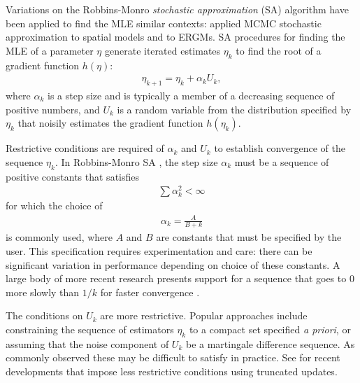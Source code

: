 Variations on the Robbins-Monro \emph{stochastic approximation} (SA) algorithm 
\citep{Robbins-Monro} have been applied to find the MLE similar contexts: 
\citet{Younes:1988,Younes:1989,Moyeed:1991,Gu:2001}
applied MCMC stochastic approximation to spatial models and \citet{Snijders:2002} to 
ERGMs.
SA procedures for finding the MLE of a parameter $\eta$ generate iterated estimates 
$\eta_k$ to find the 
root of a gradient function $h(\eta)$:
\begin{align} \label{E:eta SA update}
	\eta_{k+1} = \eta_k + \alpha_k U_k,
\end{align}
where $\alpha_k$ is a step size and is typically a member of a decreasing sequence of 
positive numbers, and $U_k$ is a 
random variable from the distribution specified by $\eta_k$ that noisily estimates the 
gradient function $h(\eta_k)$.  

Restrictive conditions are required of $\alpha_k$ and $U_k$ to establish convergence 
of the sequence $\eta_k$.  
In Robbins-Monro SA \citep{Robbins-Monro}, the step size $\alpha_k$ must be a sequence 
of positive constants 
that satisfies 
\begin{align*}
	\sum \alpha_k^2 < \infty
\end{align*}
for which the choice of
\begin{align} \label{E:SA step size}
	\alpha_k = \frac{A}{B + k}
\end{align}
 is commonly used, where $A$ and $B$ are constants that must be specified by the user.  
This specification requires experimentation and care: there can be significant 
variation in performance depending on choice of these constants. 
A large body of more recent research presents support for a sequence that goes to 0 
more slowly than $1/k$ 
for faster convergence \citep[Chapter 11]{Kushner:1997}.  

The conditions on $U_k$ are more restrictive.  Popular approaches include constraining 
the sequence of estimators $\eta_k$ to a compact set specified \emph{a priori}, 
or assuming that the noise component of $U_k$ be a martingale 
difference sequence.  As commonly observed \citep*{Chen:2002,Andrieu:2005,Liang:2010} 
these may be 
difficult to satisfy in practice.  
See \citep{Andrieu:2005,Liang:2010} for recent developments that impose less 
restrictive conditions using truncated 
updates.


